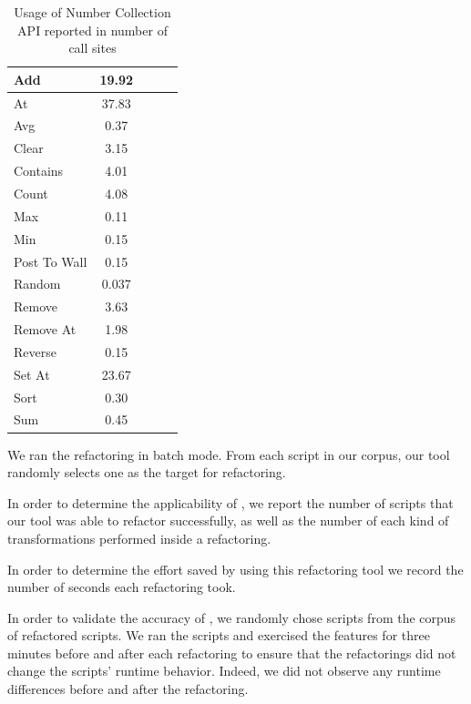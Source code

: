 \documentclass[preprint]{sigplanconf}
\begin{document}
\begin{table}[htdp]
\begin{center}
\begin{tabular}{lclcl}
\hline
Add & 19.92 \\
\hline
 At & 37.83 \\
 \hline
 Avg & 0.37\\
 \hline
 Clear & 3.15\\
 \hline 
 Contains & 4.01\\
 \hline 
 Count & 4.08\\
 \hline 
 Max & 0.11\\
 \hline 
 Min & 0.15\\
 \hline 
 Post To Wall & 0.15\\
 \hline 
 Random & 0.037\\
 \hline 
 Remove & 3.63\\
 \hline 
 Remove At & 1.98\\
 \hline 
 Reverse & 0.15\\
 \hline 
 Set At & 23.67\\
 \hline 
 Sort & 0.30\\
 \hline 
 Sum & 0.45\\
\hline

\end{tabular}
\nocaptionrule
\caption{Usage of Number Collection API reported in number of call sites}
\label{table:UsageOfAPIS}
\end{center}
\end{table}%




We ran the refactoring in batch mode. From each script in our corpus, our tool randomly selects one \NC{} as the target for refactoring. 

In order to determine the applicability of \tool, we report the number of scripts that our tool was able to refactor successfully, as well as the number of each kind of transformations performed inside a refactoring.

In order to determine the effort saved by using this refactoring tool we record the number of seconds each refactoring took. 

In order to validate the accuracy of \tool, we randomly chose \numManual scripts from the corpus of \numScripts refactored scripts. We ran the scripts and exercised the features for three minutes before and after each refactoring to ensure that the refactorings did not change the scripts' runtime behavior. Indeed, we did not observe any runtime differences before and after the refactoring. 
\end{document}
